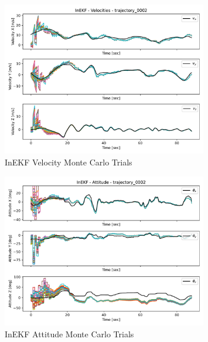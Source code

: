 \begin{figure}[H]
    \centering
    \includegraphics[width=0.8\textwidth]{figs/InEKF_trajectory_0002_velocities.pdf}
    \caption{InEKF Velocity Monte Carlo Trials}
    \label{fig: InEKF Velocity Monte Carlo Trials}
\end{figure}

\begin{figure}[H]
    \centering
    \includegraphics[width=0.8\textwidth]{figs/InEKF_trajectory_0002_attitudes.pdf}
    \caption{InEKF Attitude Monte Carlo Trials}
    \label{fig: InEKF Attitude Monte Carlo Trials}
\end{figure}

